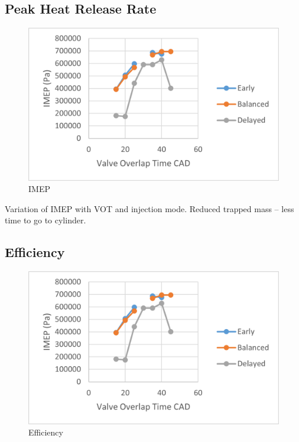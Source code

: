 \documentclass[conference]{IEEEtran}
\begin{document}
\subsection{Peak Heat Release Rate}
\begin{figure}[htbp]
    \centerline{\includegraphics{Plots/imep.png}}
    \caption{IMEP}
    \label{plt_5}
    \end{figure}
Variation of IMEP with VOT and injection mode.
Reduced trapped mass – less time to go to cylinder.
    
\subsection{Efficiency}
\begin{figure}[htbp]
    \centerline{\includegraphics{Plots/imep.png}}
    \caption{Efficiency}
    \label{plt_6}
    \end{figure}
\end{document}
